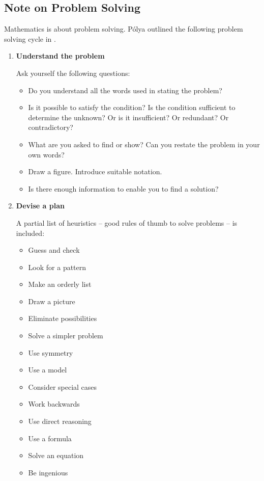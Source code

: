 \subsection*{Note on Problem Solving}
Mathematics is about problem solving. P\'{o}lya outlined the following problem solving cycle in \cite{polya}.
\begin{enumerate}
\item \textbf{Understand the problem}

Ask yourself the following questions:
\begin{itemize}
\item Do you understand all the words used in stating the problem?
\item Is it possible to satisfy the condition? Is the condition sufficient to determine the unknown? Or is it insufficient? Or redundant? Or contradictory?
\item What are you asked to find or show? Can you restate the problem in your own words?
\item Draw a figure. Introduce suitable notation.
\item Is there enough information to enable you to find a solution?
\end{itemize}

\item \textbf{Devise a plan}

A partial list of heuristics -- good rules of thumb to solve problems -- is included:
\begin{multicols}{2}
\begin{itemize}
\item Guess and check
\item Look for a pattern
\item Make an orderly list
\item Draw a picture
\item Eliminate possibilities
\item Solve a simpler problem
\item Use symmetry
\item Use a model
\item Consider special cases
\item Work backwards
\item Use direct reasoning
\item Use a formula
\item Solve an equation
\item Be ingenious
\end{itemize}
\end{multicols}


\end{enumerate}
